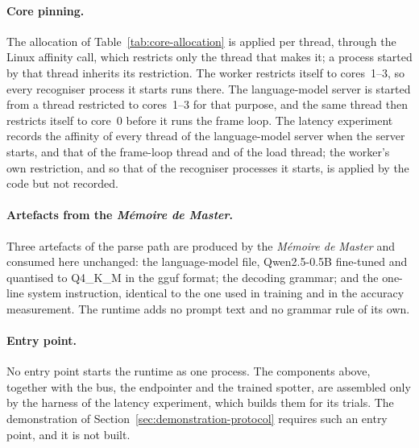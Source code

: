 \paragraph{Core pinning.} The allocation of Table~\ref{tab:core-allocation} is applied per thread,
through the Linux affinity call, which restricts only the thread that makes it; a process started
by that thread inherits its restriction. The worker restricts itself to cores~1--3, so every
recogniser process it starts runs there. The language-model server is started from a thread
restricted to cores~1--3 for that purpose, and the same thread then restricts itself to core~0
before it runs the frame loop. The latency experiment records the affinity of every thread of the
language-model server when the server starts, and that of the frame-loop thread and of the load
thread; the worker's own restriction, and so that of the recogniser processes it starts, is applied
by the code but not recorded.

\paragraph{Artefacts from the \emph{M\'emoire de Master}.} Three artefacts of the parse path are produced
by the \emph{M\'emoire de Master} and consumed here unchanged: the language-model file, Qwen2.5-0.5B
fine-tuned and quantised to Q4\_K\_M in the \gls{gguf} format; the decoding grammar; and the
one-line system instruction, identical to the one used in training and in the accuracy measurement.
The runtime adds no prompt text and no grammar rule of its own.

\paragraph{Entry point.} No entry point starts the runtime as one process. The components above,
together with the bus, the endpointer and the trained spotter, are assembled only by the harness of
the latency experiment, which builds them for its trials. The demonstration of
Section~\ref{sec:demonstration-protocol} requires such an entry point, and it is not built.

\noautobreak
